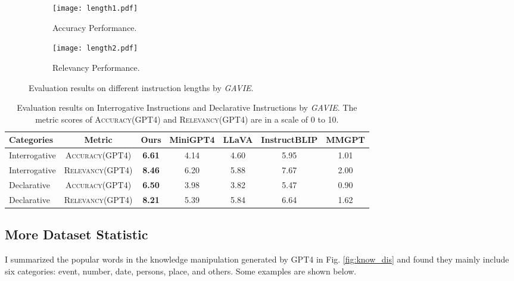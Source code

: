 \begin{figure}[t]
     \centering
     \begin{subfigure}[b]{0.49\textwidth}
         \centering
         \texttt{[image: length1.pdf]}
         \vspace{-0.2in}
         \caption{Accuracy Performance.}
         \label{length1}
     \end{subfigure}
     \hfill
     \begin{subfigure}[b]{0.49\textwidth}
         \centering
         \texttt{[image: length2.pdf]}
         \vspace{-0.2in}
         \caption{Relevancy Performance.}
         \label{length2}
     \end{subfigure}
        \caption{Evaluation results on different instruction lengths by \textit{GAVIE}. }
        \label{fig:length}
\vspace{-0.2in}
\end{figure}


\begin{table}[h]
\centering
\small
\begin{tabular}{lcccccc}
\toprule[1.5pt]
Categories & Metric &Ours & MiniGPT4 & LLaVA & InstructBLIP & MMGPT\\
\midrule
Interrogative&\textsc{Accuracy(GPT4)} & \textbf{6.61} &  4.14 & 4.60 & 5.95 & 1.01\\
Interrogative&\textsc{Relevancy(GPT4)} & \textbf{8.46} &  6.20 & 5.88 & 7.67 & 2.00\\
\midrule
Declarative&\textsc{Accuracy(GPT4)} & \textbf{6.50} & 3.98 & 3.82 & 5.47 & 0.90\\
Declarative&\textsc{Relevancy(GPT4)} & \textbf{8.21} & 5.39 & 5.84 & 6.64 & 1.62\\
\bottomrule[1.5pt]
\end{tabular}
\vspace{0.05in}
\caption{
Evaluation results on Interrogative Instructions and Declarative Instructions by \textit{GAVIE}. The metric scores of \textsc{Accuracy(GPT4)} and \textsc{Relevancy(GPT4)} are in a scale of 0 to 10.
}
\label{tab:Interrogative}
\vspace{-0.2in}
\end{table}


\subsection{More Dataset Statistic}
I summarized the popular words in the knowledge manipulation generated by GPT4 in Fig. \ref{fig:know_dis} and found they mainly include six categories: event, number, date, persons, place, and others. Some examples are shown below.

